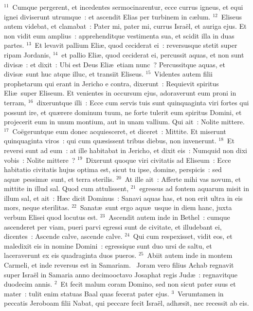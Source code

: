 ${}^{11}$~Cumque pergerent, et incedentes sermocinarentur, ecce currus igneus, et equi ignei diviserunt utrumque~: et ascendit Elias per turbinem in c\ae lum.
${}^{12}$~Eliseus autem videbat, et clamabat~: Pater mi, pater mi, currus Isra\"el, et auriga ejus. Et non vidit eum amplius~: apprehenditque vestimenta sua, et scidit illa in duas partes.
${}^{13}$~Et levavit pallium Eli\ae , quod ceciderat ei~: reversusque stetit super ripam Jordanis,
${}^{14}$~et pallio Eli\ae , quod ceciderat ei, percussit aquas, et non sunt divis\ae~: et dixit~: Ubi est Deus Eli\ae\ etiam nunc~? Percussitque aquas, et divis\ae\ sunt huc atque illuc, et transiit Eliseus.
${}^{15}$~Videntes autem filii prophetarum qui erant in Jericho e contra, dixerunt~: Requievit spiritus Eli\ae\ super Eliseum. Et venientes in occursum ejus, adoraverunt eum proni in terram,
${}^{16}$~dixeruntque illi~: Ecce cum servis tuis sunt quinquaginta viri fortes qui possunt ire, et qu\ae rere dominum tuum, ne forte tulerit eum spiritus Domini, et projecerit eum in unum montium, aut in unam vallium. Qui ait~: Nolite mittere.
${}^{17}$~Co\"egeruntque eum donec acquiesceret, et diceret~: Mittite. Et miserunt quinquaginta viros~: qui cum qu\ae sissent tribus diebus, non invenerunt.
${}^{18}$~Et reversi sunt ad eum~: at ille habitabat in Jericho, et dixit eis~: Numquid non dixi vobis~: Nolite mittere~?
${}^{19}$~Dixerunt quoque viri civitatis ad Eliseum~: Ecce habitatio civitatis hujus optima est, sicut tu ipse, domine, perspicis~: sed aqu\ae\ pessim\ae\ sunt, et terra sterilis.
${}^{20}$~At ille ait~: Afferte mihi vas novum, et mittite in illud sal. Quod cum attulissent,
${}^{21}$~egressus ad fontem aquarum misit in illum sal, et ait~: H\ae c dicit Dominus~: Sanavi aquas has, et non erit ultra in eis mors, neque sterilitas.
${}^{22}$~Sanat\ae\ sunt ergo aqu\ae\ usque in diem hanc, juxta verbum Elisei quod locutus est.
${}^{23}$~Ascendit autem inde in Bethel~: cumque ascenderet per viam, pueri parvi egressi sunt de civitate, et illudebant ei, dicentes~: Ascende calve, ascende calve.
${}^{24}$~Qui cum respexisset, vidit eos, et maledixit eis in nomine Domini~: egressique sunt duo ursi de saltu, et laceraverunt ex eis quadraginta duos pueros.
${}^{25}$~Abiit autem inde in montem Carmeli, et inde reversus est in Samariam.
~Joram vero filius Achab regnavit super Isra\"el in Samaria anno decimooctavo Josaphat regis Jud\ae~: regnavitque duodecim annis.
${}^{2}$~Et fecit malum coram Domino, sed non sicut pater suus et mater~: tulit enim statuas Baal quas fecerat pater ejus.
${}^{3}$~Verumtamen in peccatis Jeroboam filii Nabat, qui peccare fecit Isra\"el, adh\ae sit, nec recessit ab eis.
